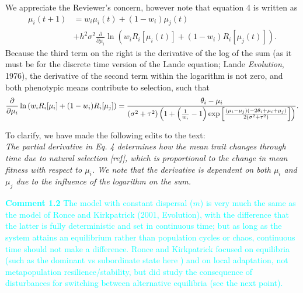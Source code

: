 \documentclass[ucm,12pt]{ucletter}
\begin{document}
\begin{letter}
 We appreciate the Reviewer's concern, however note that equation 4 is written as
\begin{align}
  \label{eq:mu}
  \mu_i(t+1) &= w_i\mu_i(t) + (1-w_i)\mu_j(t) \\ \nonumber
  &+ h^2\sigma^2\frac{\partial}{\partial \mu_i}\ln\left(w_i R_i[\mu_i(t)] + (1-w_i)R_i[\mu_j(t)]  \right).
\end{align}
Because the third term on the right is the derivative of the log of the sum (as it must be for the discrete time version of the Lande equation; Lande \emph{Evolution}, 1976), the derivative of the second term within the logarithm is not zero, and both phenotypic means contribute to selection, such that
\begin{equation}
  \frac{\partial}{\partial \mu_i}\ln\left(w_i R_i[\mu_i] + (1-w_i)R_i[\mu_j]  \right) = \frac{\theta_i-\mu_i}{\left(\sigma ^2+\tau ^2\right) \left(1+\left(\frac{1}{w_i}-1\right) {\rm exp}\left[\frac{(\mu_i-\mu_j) (-2 \theta_i+\mu_i+\mu_j)}{2 \left(\sigma ^2+\tau ^2\right)}\right]\right)}.
\end{equation}

\noindent To clarify, we have made the following edits to the text:\\
 \emph{The partial derivative in Eq. 4 determines how the mean trait changes through time due to natural selection [ref], which is proportional to the change in mean fitness with respect to $\mu_i$.
We note that the derivative is dependent on both $\mu_i$ and $\mu_j$ due to the influence of the logarithm on the sum.}

\noindent \textcolor{cyan}{
{\bf Comment 1.2} The model with constant dispersal ($m$) is very much the same as the model of Ronce and Kirkpatrick (2001, Evolution), with the difference that the latter is fully deterministic and set in continuous time; but as long as the system attains an equilibrium rather than population cycles or chaos, continuous time should not make a difference. Ronce and Kirkpatrick focused on equilibria (such as the dominant vs subordinate state here ) and on local adaptation, not metapopulation resilience/stability, but did study the consequence of disturbances for switching between alternative equilibria (see the next point).
}


\end{letter}
\end{document}
